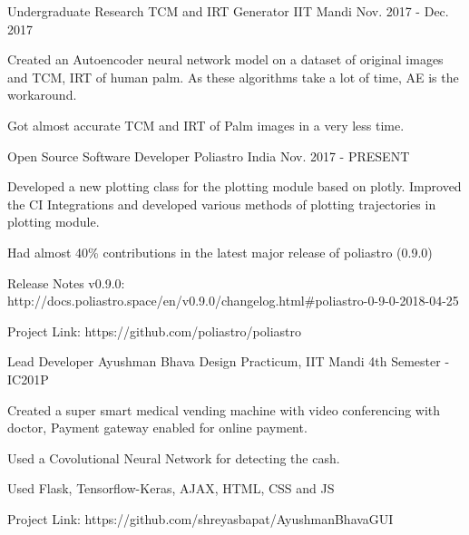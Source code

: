 \begin{cventries}
\cventry
{Undergraduate Research} %
{TCM and IRT Generator} %
{IIT Mandi} %
{Nov. 2017 - Dec. 2017} %
{ %
\begin{cvitems}
\item {Created an Autoencoder neural network model on a dataset of original images and TCM, IRT of human palm. As these algorithms take a lot of time, AE is the workaround.}
\item {Got almost accurate TCM and IRT of Palm images in a very less time.}
\end{cvitems}
}


\cventry
{Open Source Software Developer} %
{Poliastro} %
{India} %
{Nov. 2017 - PRESENT} %
{ %
\begin{cvitems}
\item {Developed a new plotting class for the plotting module based on plotly. Improved the CI Integrations and developed various methods of plotting trajectories in plotting module.}
\item {Had almost 40\% contributions in the latest major release of poliastro (0.9.0)}
\item {Release Notes v0.9.0: http://docs.poliastro.space/en/v0.9.0/changelog.html#poliastro-0-9-0-2018-04-25}
\item {Project Link: https://github.com/poliastro/poliastro}
\end{cvitems}
}


\cventry
{Lead Developer} %
{Ayushman Bhava} %
{Design Practicum, IIT Mandi} %
{4th Semester - IC201P} %
{ %
\begin{cvitems}
\item {Created a super smart medical vending machine with video conferencing with doctor, Payment gateway enabled for online payment.}
\item {Used a Covolutional Neural Network for detecting the cash.}
\item {Used Flask, Tensorflow-Keras, AJAX, HTML, CSS and JS}
\item {Project Link: https://github.com/shreyasbapat/AyushmanBhavaGUI}
\end{cvitems}
}


\end{cventries}
